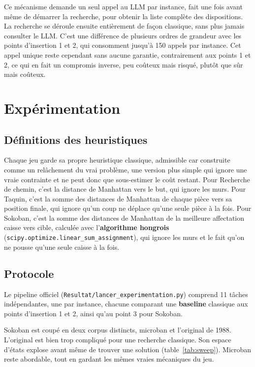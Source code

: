 \documentclass[11pt,a4paper]{article}
\begin{document}
Ce mécanisme demande un seul appel au LLM par instance, fait une fois avant même de démarrer la recherche, pour obtenir la liste complète des dispositions. La recherche se déroule ensuite entièrement de façon classique, sans plus jamais consulter le LLM. C'est une différence de plusieurs ordres de grandeur avec les points d'insertion 1 et 2, qui consomment jusqu'à 150 appels par instance. Cet appel unique reste cependant sans aucune garantie, contrairement aux points 1 et 2, ce qui en fait un compromis inverse, peu coûteux mais risqué, plutôt que sûr mais coûteux.

\section{Expérimentation}
\label{sec:experimentation}

\subsection{Définitions des heuristiques}

Chaque jeu garde sa propre heuristique classique, admissible car
construite comme un relâchement du vrai problème, une version plus
simple qui ignore une vraie contrainte et ne peut donc que sous-estimer
le coût restant. Pour Recherche de chemin, c'est la distance de
Manhattan vers le but, qui ignore les murs. Pour Taquin, c'est la somme
des distances de Manhattan de chaque pièce vers sa position finale, qui
ignore qu'un coup ne déplace qu'une seule pièce à la fois. Pour Sokoban,
c'est la somme des distances de Manhattan de la meilleure affectation
caisse vers cible, calculée avec l'\textbf{algorithme hongrois}
(\texttt{scipy.optimize.linear\_sum\_assignment}), qui ignore les murs
et le fait qu'on ne pousse qu'une seule caisse à la fois.

\subsection{Protocole}

Le pipeline officiel (\texttt{Resultat/lancer\_experimentation.py})
comprend 11 tâches indépendantes, une par instance, chacune comparant
une \textbf{baseline} classique aux points d'insertion 1 et 2, ainsi
qu'au point 3 pour Sokoban.

Sokoban est coupé en deux corpus distincts, microban et l'original de
1988. L'original est bien trop compliqué pour une recherche classique.
Son espace d'états explose avant même de trouver une solution
(table~\ref{tab:sweep}). Microban reste abordable, tout en gardant les
mêmes vraies mécaniques du jeu.
\end{document}
